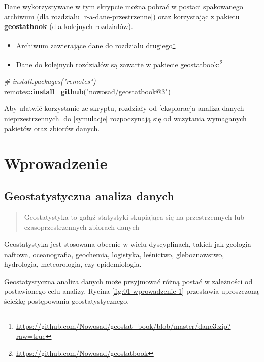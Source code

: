 \documentclass[
  paper=6in:9in,pagesize=pdftex,headinclude=on,footinclude=on,10pt]{scrbook}
\newenvironment{Shaded}{\begin{snugshade}}{\end{snugshade}}
\newcommand{\CommentTok}[1]{\textcolor[rgb]{0.56,0.35,0.01}{\textit{#1}}}
\newcommand{\FunctionTok}[1]{\textcolor[rgb]{0.13,0.29,0.53}{\textbf{#1}}}
\newcommand{\NormalTok}[1]{#1}
\newcommand{\SpecialCharTok}[1]{\textcolor[rgb]{0.81,0.36,0.00}{\textbf{#1}}}
\newcommand{\StringTok}[1]{\textcolor[rgb]{0.31,0.60,0.02}{#1}}
\providecommand{\tightlist}{%
  \setlength{\itemsep}{0pt}\setlength{\parskip}{0pt}}
\renewcommand{\href}[2]{#2 (\url{#1})}
\renewcommand{\href}[2]{#2\footnote{\url{#1}}}
\begin{document}
Dane wykorzystywane w tym skrypcie można pobrać w postaci spakowanego archiwum (dla rozdziału \ref{r-a-dane-przestrzenne}) oraz korzystając z pakietu \textbf{geostatbook} (dla kolejnych rozdziałów).

\begin{itemize}
\tightlist
\item
  \href{https://github.com/Nowosad/geostat_book/blob/master/dane3.zip?raw=true}{Archiwum zawierające dane do rozdziału drugiego}
\item
  \href{https://github.com/Nowosad/geostatbook}{Dane do kolejnych rozdziałów są zawarte w pakiecie geostatbook:}
\end{itemize}

\begin{Shaded}
\begin{Highlighting}[]
\CommentTok{\# install.packages("remotes")}
\NormalTok{remotes}\SpecialCharTok{::}\FunctionTok{install\_github}\NormalTok{(}\StringTok{"nowosad/geostatbook@3"}\NormalTok{)}
\end{Highlighting}
\end{Shaded}

Aby ułatwić korzystanie ze skryptu, rozdziały od \ref{eksploracja-analiza-danych-nieprzestrzennych} do \ref{symulacje} rozpoczynają się od wczytania wymaganych pakietów oraz zbiorów danych.

\chapter{Wprowadzenie}\label{wprowadzenie}

\section{Geostatystyczna analiza danych}\label{geostatystyczna-analiza-danych}

\begin{quote}
Geostatystyka to gałąź statystyki skupiająca się na przestrzennych lub czasoprzestrzennych zbiorach danych
\end{quote}

Geostatystyka jest stosowana obecnie w wielu dyscyplinach, takich jak geologia naftowa, oceanografia, geochemia, logistyka, leśnictwo, gleboznawstwo, hydrologia, meteorologia, czy epidemiologia.

Geostatystyczna analiza danych może przyjmować różną postać w zależności od postawionego celu analizy.
Rycina \ref{fig:01-wprowadzenie-1} przestawia uproszczoną ścieżkę postępowania geostatystycznego.
\end{document}
